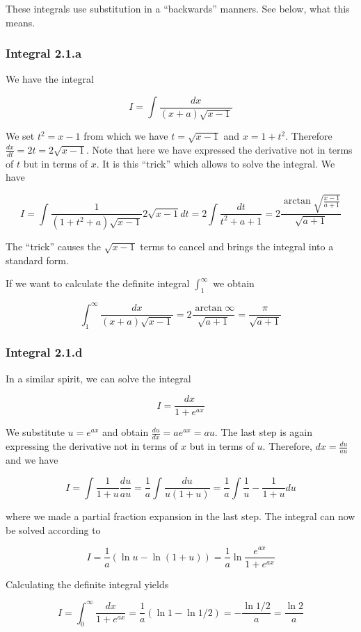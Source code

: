 
These integrals use substitution in a ``backwards'' manners. See below,
what this means.

\subsubsection{Integral 2.1.a}

We have the integral

\[
I = \int \frac{dx}{(x+a)\sqrt{x-1}}
\]

We set \(t^2 = x-1\) from which we have \(t=\sqrt{x-1}\) and
\(x=1+t^2\). Therefore \(\frac{dx}{dt} = 2t = 2\sqrt{x-1}\). Note that
here we have expressed the derivative not in terms of \(t\) but in terms
of \(x\). It is this ``trick'' which allows to solve the integral. We
have

\[
I = \int \frac{1}{(1+t^2+a)\sqrt{x-1}}2\sqrt{x-1}dt = 2 \int \frac{dt}{t^2+a+1} = 2 \frac{\arctan {\sqrt{\frac{x-1}{a+1}}}}{\sqrt{a+1}}
\]

The ``trick'' causes the \(\sqrt{x-1}\) terms to cancel and brings the
integral into a standard form.

If we want to calculate the definite integral \(\int_1^\infty\) we
obtain

\[
\int_1^\infty \frac{dx}{(x+a)\sqrt{x-1}} = 2 \frac{\arctan \infty}{\sqrt{a+1}} = \frac{\pi}{\sqrt{a+1}}
\]

\subsubsection{Integral 2.1.d}

In a similar spirit, we can solve the integral

\[
I = \frac{dx}{1+e^{ax}}
\]

We substitute \(u = e^{ax}\) and obtain
\(\frac{du}{dx} = a e^{ax} = au\). The last step is again expressing the
derivative not in terms of \(x\) but in terms of \(u\). Therefore,
\(dx = \frac{du}{au}\) and we have

\[
I = \int \frac{1}{1+u} \frac{du}{au} = \frac{1}{a} \int \frac{du}{u(1+u)} = \frac{1}{a} \int \frac{1}{u} - \frac{1}{1+u} du
\]

where we made a partial fraction expansion in the last step. The
integral can now be solved according to

\[
I = \frac{1}{a} \left( \ln u - \ln (1+u) \right) = \frac{1}{a} \ln \frac{e^{ax}}{1+e^{ax}}
\]

Calculating the definite integral yields

\[
I = \int_0^\infty \frac{dx}{1+e^{ax}} = \frac{1}{a} \left( \ln 1 - \ln 1/2 \right) = -\frac{\ln 1/2}{a} = \frac{\ln 2}{a}
\]
